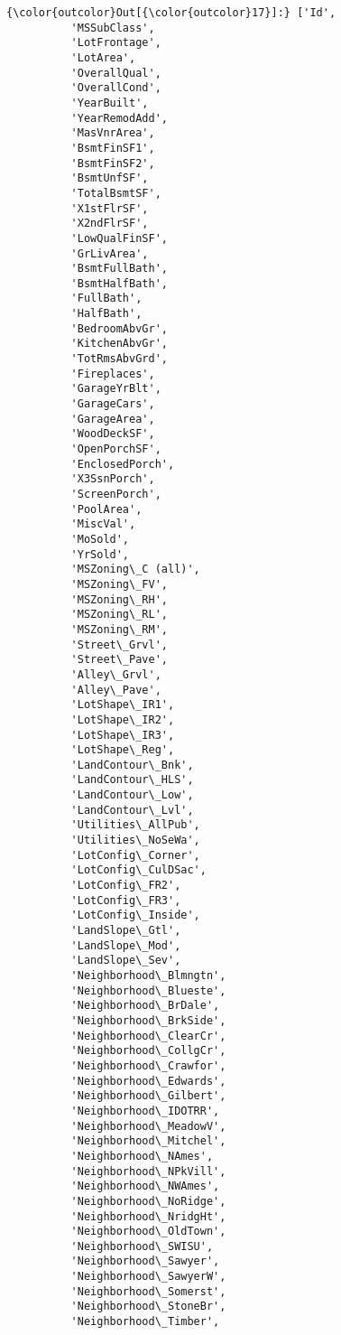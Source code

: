 \documentclass[11pt]{article}
\begin{document}
\begin{Verbatim}[commandchars=\\\{\}]
{\color{outcolor}Out[{\color{outcolor}17}]:} ['Id',
          'MSSubClass',
          'LotFrontage',
          'LotArea',
          'OverallQual',
          'OverallCond',
          'YearBuilt',
          'YearRemodAdd',
          'MasVnrArea',
          'BsmtFinSF1',
          'BsmtFinSF2',
          'BsmtUnfSF',
          'TotalBsmtSF',
          'X1stFlrSF',
          'X2ndFlrSF',
          'LowQualFinSF',
          'GrLivArea',
          'BsmtFullBath',
          'BsmtHalfBath',
          'FullBath',
          'HalfBath',
          'BedroomAbvGr',
          'KitchenAbvGr',
          'TotRmsAbvGrd',
          'Fireplaces',
          'GarageYrBlt',
          'GarageCars',
          'GarageArea',
          'WoodDeckSF',
          'OpenPorchSF',
          'EnclosedPorch',
          'X3SsnPorch',
          'ScreenPorch',
          'PoolArea',
          'MiscVal',
          'MoSold',
          'YrSold',
          'MSZoning\_C (all)',
          'MSZoning\_FV',
          'MSZoning\_RH',
          'MSZoning\_RL',
          'MSZoning\_RM',
          'Street\_Grvl',
          'Street\_Pave',
          'Alley\_Grvl',
          'Alley\_Pave',
          'LotShape\_IR1',
          'LotShape\_IR2',
          'LotShape\_IR3',
          'LotShape\_Reg',
          'LandContour\_Bnk',
          'LandContour\_HLS',
          'LandContour\_Low',
          'LandContour\_Lvl',
          'Utilities\_AllPub',
          'Utilities\_NoSeWa',
          'LotConfig\_Corner',
          'LotConfig\_CulDSac',
          'LotConfig\_FR2',
          'LotConfig\_FR3',
          'LotConfig\_Inside',
          'LandSlope\_Gtl',
          'LandSlope\_Mod',
          'LandSlope\_Sev',
          'Neighborhood\_Blmngtn',
          'Neighborhood\_Blueste',
          'Neighborhood\_BrDale',
          'Neighborhood\_BrkSide',
          'Neighborhood\_ClearCr',
          'Neighborhood\_CollgCr',
          'Neighborhood\_Crawfor',
          'Neighborhood\_Edwards',
          'Neighborhood\_Gilbert',
          'Neighborhood\_IDOTRR',
          'Neighborhood\_MeadowV',
          'Neighborhood\_Mitchel',
          'Neighborhood\_NAmes',
          'Neighborhood\_NPkVill',
          'Neighborhood\_NWAmes',
          'Neighborhood\_NoRidge',
          'Neighborhood\_NridgHt',
          'Neighborhood\_OldTown',
          'Neighborhood\_SWISU',
          'Neighborhood\_Sawyer',
          'Neighborhood\_SawyerW',
          'Neighborhood\_Somerst',
          'Neighborhood\_StoneBr',
          'Neighborhood\_Timber',

\end{Verbatim}
\end{document}

